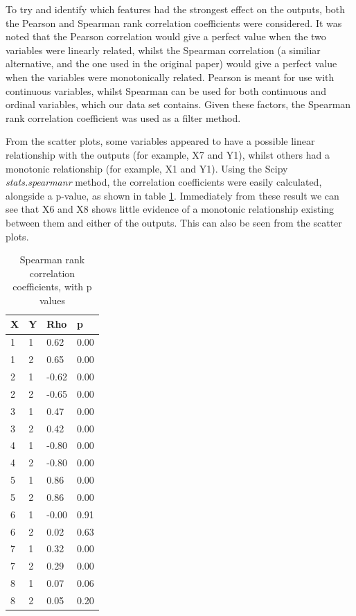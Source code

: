 \documentclass[12pt]{article}
\begin{document}
To try and identify which features had the strongest effect on the outputs, both the Pearson and Spearman rank correlation coefficients were considered. It was noted that the Pearson correlation would give a perfect value when the two variables were linearly related, whilst the Spearman correlation (a similiar alternative, and the one used in the original paper) would give a perfect value when the variables were monotonically related. Pearson is meant for use with continuous variables, whilst Spearman can be used for both continuous and ordinal variables, which our data set contains. Given these factors, the Spearman rank correlation coefficient was used as a filter method.

From the scatter plots, some variables appeared to have a possible linear relationship with the outputs (for example, X7 and Y1), whilst others had a monotonic relationship (for example, X1 and Y1). Using the Scipy \emph{stats.spearmanr} method, the correlation coefficients were easily calculated, alongside a p-value, as shown in table \ref{tbl:spearman-table}. Immediately from these result we can see that X6 and X8 shows little evidence of a monotonic relationship existing between them and either of the outputs. This can also be seen from the scatter plots.

\begin{table}[!ht]
\centering
\caption{Spearman rank correlation coefficients, with p values}
\label{tbl:spearman-table}
\begin{tabular}{||llll||}
\hline
X    				& Y & Rho   & p    \\
\hline
1                   & 1 & 0.62  & 0.00 \\
1                   & 2 & 0.65  & 0.00 \\
2                   & 1 & -0.62 & 0.00 \\
2                   & 2 & -0.65 & 0.00 \\
3                   & 1 & 0.47  & 0.00 \\
3                   & 2 & 0.42  & 0.00 \\
4                   & 1 & -0.80 & 0.00 \\
4                   & 2 & -0.80 & 0.00 \\
5                   & 1 & 0.86  & 0.00 \\
5                   & 2 & 0.86  & 0.00 \\
6                   & 1 & -0.00 & 0.91 \\
6                   & 2 & 0.02  & 0.63 \\
7                   & 1 & 0.32  & 0.00 \\
7                   & 2 & 0.29  & 0.00 \\
8                   & 1 & 0.07  & 0.06 \\
8                   & 2 & 0.05  & 0.20 \\
\hline
\end{tabular}
\end{table}
\end{document}

